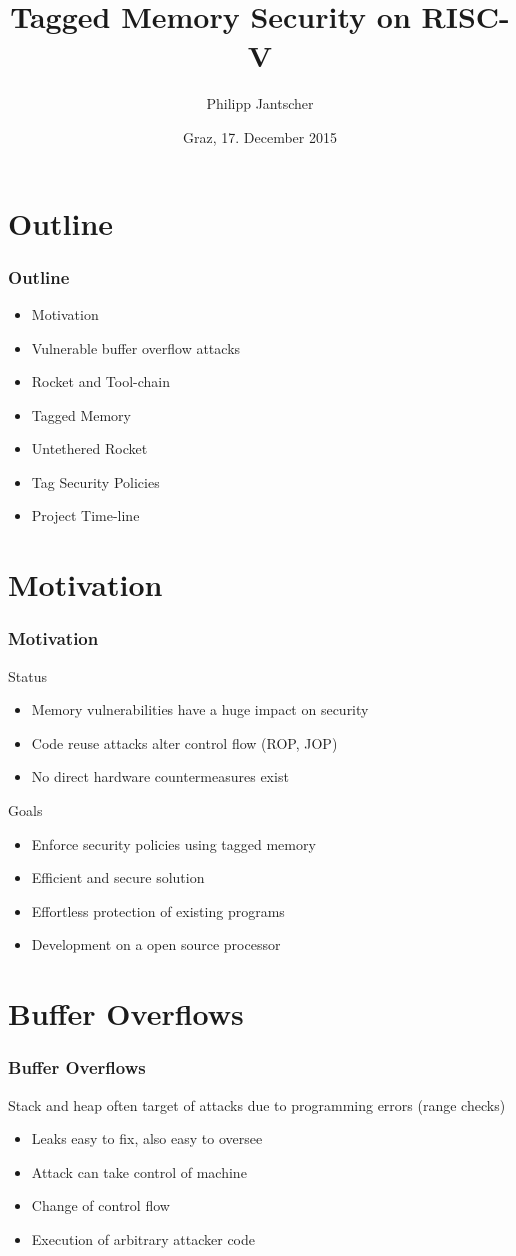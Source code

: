 \documentclass{beamer}
\title[Tagged Memory Security on RISC-V]{Tagged Memory Security on RISC-V}
\author{Philipp Jantscher}
\date{Graz, 17. December 2015}		%
\institute[IAIK]{IAIK}
\begin{document}
\titleframe

\section{Outline}
\begin{frame}
	\frametitle{Outline}
	\begin{itemize}
		\item Motivation
    	\item Vulnerable buffer overflow attacks
    	\item Rocket and Tool-chain
    	\item Tagged Memory
    	\item Untethered Rocket
    	\item Tag Security Policies
    	\item Project Time-line
	\end{itemize}
\end{frame}


\section{Motivation}
\begin{frame}
	\frametitle{Motivation}
	Status
	\begin{itemize}
		\item Memory vulnerabilities have a huge impact on security
		\item Code reuse attacks alter control flow (ROP, JOP)
    	\item No direct hardware countermeasures exist %
	\end{itemize}
	Goals
	\begin{itemize}
		\item Enforce security policies using tagged memory
    	\item Efficient and secure solution
    	\item Effortless protection of  existing programs
    	\item Development on a open source processor 
	\end{itemize}
\end{frame}

\section{Buffer Overflows}
\begin{frame}
	\frametitle{Buffer Overflows}
	Stack and heap often target of attacks due to programming errors (range checks)
	\begin{itemize}
		\item Leaks easy to fix,  also easy to oversee
		\item Attack can take control of machine
		\item Change of control flow
		\item Execution of arbitrary attacker code
	\end{itemize}
\end{frame}
\end{document}
